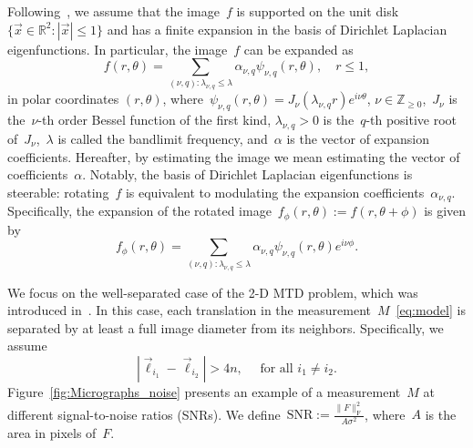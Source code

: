 \documentclass{article}
\begin{document}
Following~\cite{marshall2020image,bendory2021multi,kreymer2021two,zhao2013fourier}, we assume that the image~$f$ is supported on the unit disk \mbox{$\{\vec{x} \in \mathbb{R}^2: |\vec{x}| \le 1\}$}
and has a finite expansion in the basis of Dirichlet Laplacian eigenfunctions. In particular, the image~$f$ can be expanded as
\begin{equation}
\label{eq:expansion}
f (r, \theta) = \sum_{(\nu, q): \lambda_{\nu, q} \le \lambda} \alpha_{\nu, q} \psi_{\nu, q} (r, \theta), \quad r \le 1, 
\end{equation}
in polar coordinates $(r, \theta)$, where~$\psi_{\nu, q}(r,\theta) = J_\nu\left( \lambda_{\nu, q} r \right) e^{i \nu \theta}$, $\nu \in \mathbb{Z}_{\ge 0}$,~$J_\nu$ is the~\mbox{$\nu$-th} order Bessel function of the first kind, \mbox{$\lambda_{\nu, q} > 0$} is the~\mbox{$q$-th} positive root of~$J_\nu$,~$\lambda$ is called the bandlimit frequency, and~$\alpha$ is the vector of expansion coefficients. Hereafter, by estimating the image we mean estimating the vector of coefficients~$\alpha$. Notably, the basis of Dirichlet Laplacian eigenfunctions is steerable: rotating~$f$ is equivalent to modulating the expansion coefficients~$\alpha_{\nu, q}$. Specifically, the expansion of the rotated image~$f_\phi (r, \theta) := f(r, \theta + \phi)$ is given by
\begin{equation}
\label{eq:steering}
f_\phi (r, \theta) = \sum_{(\nu, q): \lambda_{\nu, q} \le \lambda} \alpha_{\nu, q} \psi_{\nu, q} (r, \theta) e^{i \nu \phi}.
\end{equation}

We focus on the \mbox{well-separated} case of the 2-D MTD problem, which was introduced in~\cite{marshall2020image, bendory2021multi}. In this case, each translation in the measurement~$M$~\eqref{eq:model} is separated by at least a full image diameter from its neighbors. Specifically, we assume
\begin{equation}
\label{eq:sep}
|\vec{\ell}_{i_1} - \vec{\ell}_{i_2}| > 4n, \quad \text{ for all } i_1 \ne i_2.
\end{equation}
Figure~\ref{fig:Micrographs_noise} presents an example of a measurement~$M$ at different signal-to-noise ratios (SNRs). We define~\mbox{$\text{SNR} := \frac{\|F\|_\text{F}^2}{A \sigma^2}$}, where~$A$ is the area in pixels of~$F$.
\end{document}
